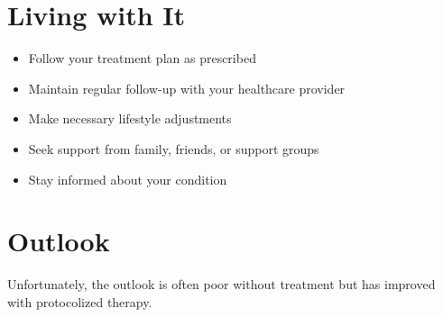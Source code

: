 \section{Living with It}
\begin{itemize}[noitemsep]
  \item Follow your treatment plan as prescribed
  \item Maintain regular follow-up with your healthcare provider
  \item Make necessary lifestyle adjustments
  \item Seek support from family, friends, or support groups
  \item Stay informed about your condition
\end{itemize}
\section{Outlook}
Unfortunately, the outlook is often poor without treatment but has improved with protocolized therapy.
